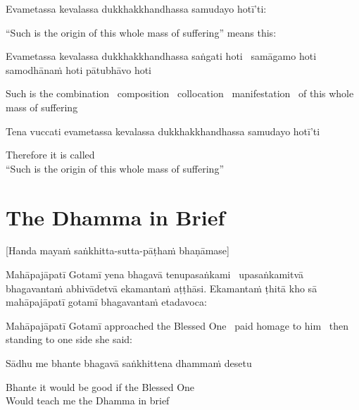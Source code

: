 Evametassa kevalassa dukkhakkhandhassa samudayo hotī’ti:

\begin{english}
  “Such is the origin of this whole mass of suffering” means this:
\end{english}

Evametassa kevalassa dukkhakkhandhassa saṅgati hoti \breathmark\ samāgamo hoti samodhānaṁ hoti pātubhāvo hoti

\begin{english}
  Such is the combination \breathmark\ composition \breathmark\ collocation \breathmark\ manifestation \breathmark\ of this whole mass of suffering
\end{english}

Tena vuccati evametassa kevalassa dukkhakkhandhassa samudayo hotī’ti

\begin{english}
  Therefore it is called\\
  “Such is the origin of this whole mass of suffering”
\end{english}



\section{The Dhamma in Brief}
\label{dhamma-in-brief}

\begin{center}
  [Handa mayaṁ saṅkhitta-sutta-pāṭhaṁ bhaṇāmase]
\end{center}

Mahāpajāpatī Gotamī yena bhagavā tenupasaṅkami \breathmark\ upasaṅkamitvā bhagavantaṁ abhivādetvā ekamantaṁ aṭṭhāsi. Ekamantaṁ ṭhitā kho sā mahāpajāpatī gotamī bhagavantaṁ etadavoca:

\begin{english}
  Mahāpajāpatī Gotamī approached the Blessed One \breathmark\ paid homage to him \breathmark\ then standing to one side she said:
\end{english}

Sādhu me bhante bhagavā saṅkhittena dhammaṁ desetu

\begin{english}
  Bhante it would be good if the Blessed One\\
  Would teach me the Dhamma in brief
\end{english}

